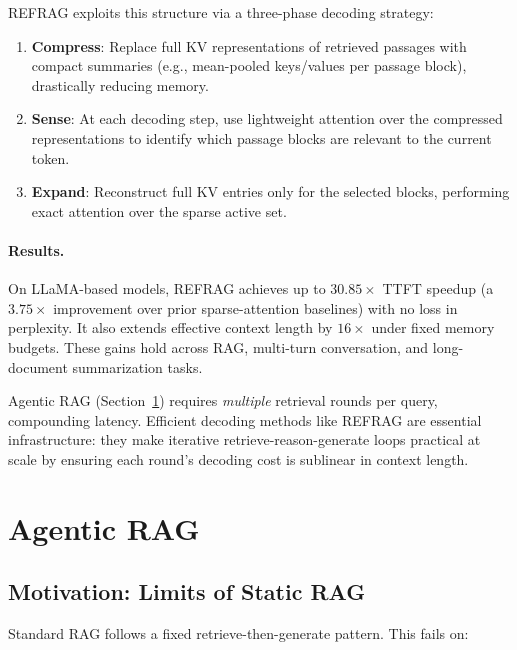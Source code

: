 REFRAG exploits this structure via a three-phase decoding strategy:

\begin{enumerate}
  \item \textbf{Compress}: Replace full KV representations of retrieved passages with compact summaries (e.g., mean-pooled keys/values per passage block), drastically reducing memory.
  \item \textbf{Sense}: At each decoding step, use lightweight attention over the compressed representations to identify which passage blocks are relevant to the current token.
  \item \textbf{Expand}: Reconstruct full KV entries only for the selected blocks, performing exact attention over the sparse active set.
\end{enumerate}

\paragraph{Results.}
\label{results.}

On LLaMA-based models, REFRAG achieves up to $30.85\times$ TTFT speedup (a $3.75\times$ improvement over prior sparse-attention baselines) with no loss in perplexity. It also extends effective context length by $16\times$ under fixed memory budgets. These gains hold across RAG, multi-turn conversation, and long-document summarization tasks.

\begin{intuitionbox}
Agentic RAG (Section~\ref{sec:agentic_rag}) requires \emph{multiple} retrieval rounds per query, compounding latency. Efficient decoding methods like REFRAG are essential infrastructure: they make iterative retrieve-reason-generate loops practical at scale by ensuring each round’s decoding cost is sublinear in context length.
\end{intuitionbox}

\section{Agentic RAG}
\label{sec:agentic_rag}

\subsection{Motivation: Limits of Static RAG}
\label{motivation-limits-of-static-rag}

Standard RAG follows a fixed retrieve-then-generate pattern. This fails on:

